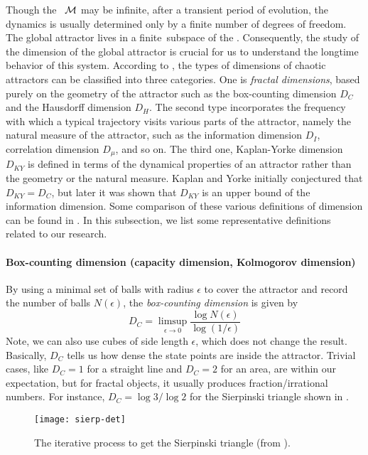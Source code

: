 Though the \statesp\ $\mathcal{M}$ may be infinite\dmn,
after a transient period of evolution,
the dynamics is usually
determined only by a finite number of degrees of freedom.
The global attractor lives in a finite\dmn\ subspace of the
\statesp. Consequently, the study of the dimension of the global
attractor is crucial for us to understand the longtime behavior of
this system.
According to , the types of dimensions of chaotic attractors
can be classified into three categories. One is \emph{fractal dimensions},
based purely on the
geometry of the attractor such as the
box-counting dimension $D_{C}$ and the Hausdorff dimension $D_H$.
The second type
incorporates the frequency with which a typical
trajectory visits various parts of the attractor, namely the natural
measure of the attractor, such as  the information dimension $D_I$,
correlation
dimension $D_\mu$, and so on. The third one,
Kaplan-Yorke
dimension $D_{KY}$ is defined in terms of the dynamical properties of an
attractor rather than the geometry or the natural measure.
Kaplan and Yorke
initially conjectured that $D_{KY} = D_{C}$, but later
it was shown that $D_{KY}$ is an upper bound of the information dimension.
Some comparison of these various definitions of dimension can be found in
. In this subsection, we list some
representative definitions related to our research.

\paragraph{Box-counting dimension (capacity dimension, Kolmogorov dimension)}
By using a minimal set of balls with radius $\epsilon$ to cover the
attractor and record the number of balls $N(\epsilon)$,
the \emph{box-counting dimension}
is given by
\begin{equation}
  \label{eq:dc}
  D_C = \limsup_{\epsilon \to 0} \frac{\log N(\epsilon)}{\log(1/\epsilon)}
\end{equation}
Note, we can also use cubes of side length $\epsilon$, which
does not change the result.
Basically, $D_C$ tells us how dense the state points are inside the
attractor. Trivial cases, like $D_C = 1$ for a straight line and
$D_C = 2$ for an area, are within our expectation, but for
fractal objects, it usually produces fraction/irrational numbers.
For instance, $D_C = \log 3/ \log 2$ for the Sierpinski triangle shown in
.
\begin{figure}[h]
  \centering
  \texttt{[image: sierp-det]}
  \caption[The Sierpinski triangle]{
    The iterative process to get the Sierpinski triangle
    (from ).
  }
  \label{fig:sier-tri}
\end{figure}


